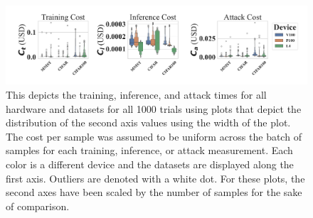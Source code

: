 \documentclass[sn-mathphys-num]{sn-jnl}%
\begin{document}
\begin{figure}[h]
    \centering
    \includegraphics[width=\textwidth]{plots/combined/cost.pdf}
    \caption{This depicts the training, inference, and attack times for all hardware and datasets for all 1000 trials using plots that depict the distribution of the second axis values using the width of the plot. The cost per sample was assumed to be uniform across the batch of samples for each training, inference, or attack measurement.
    Each color is a different device and the datasets are displayed along the first axis. Outliers are denoted with a white dot. For these plots, the second axes have been scaled by the number of samples for the sake of comparison.}
    \label{fig:cost}
\end{figure}
\end{document}
